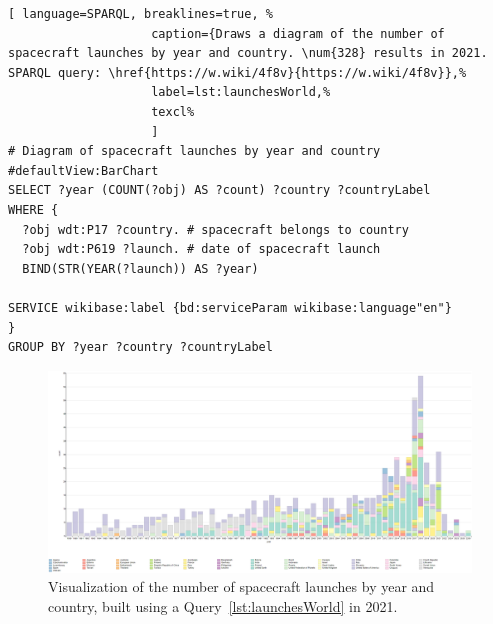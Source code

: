 \begin{lstlisting}[ language=SPARQL, breaklines=true, %
                    caption={Draws a diagram of the number of spacecraft launches by year and country. \num{328} results in 2021. SPARQL query: \href{https://w.wiki/4f8v}{https://w.wiki/4f8v}},%
                    label=lst:launchesWorld,%
                    texcl%
                    ]
# Diagram of spacecraft launches by year and country
#defaultView:BarChart
SELECT ?year (COUNT(?obj) AS ?count) ?country ?countryLabel
WHERE {
  ?obj wdt:P17 ?country. # spacecraft belongs to country 
  ?obj wdt:P619 ?launch. # date of spacecraft launch
  BIND(STR(YEAR(?launch)) AS ?year)
  
SERVICE wikibase:label {bd:serviceParam wikibase:language"en"}
}
GROUP BY ?year ?country ?countryLabel
\end{lstlisting}%

\begin{figure}[h!]
  \includegraphics[width=\linewidth]{graphics/chapter/spacecraft/Visualization of the number of spacecraft launches by year and country 2021.png}
  \caption[The schedule of spacecraft launches worldwide by year and country]{Visualization of the number of spacecraft launches by year and country, built using a Query~\protect\ref{lst:launchesWorld} in 2021.}
  \label{fig:launchesWorld}%
\end{figure}

